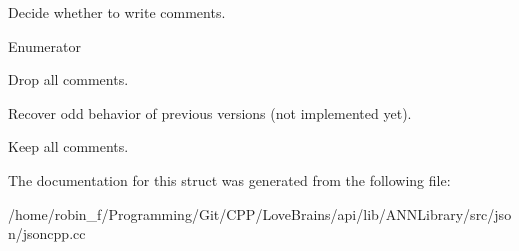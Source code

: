 Decide whether to write comments. 

\begin{Desc}
\item[Enumerator]\par
\begin{description}
\item[{\em 
\hypertarget{struct_json_1_1_comment_style_a51fc08f3518fd81eba12f340d19a3d0cac8b32a8bae63414c8647d4919da8d437}{}None\label{struct_json_1_1_comment_style_a51fc08f3518fd81eba12f340d19a3d0cac8b32a8bae63414c8647d4919da8d437}
}]Drop all comments. \item[{\em 
\hypertarget{struct_json_1_1_comment_style_a51fc08f3518fd81eba12f340d19a3d0cac65238f050773c107690a456e9c05c98}{}Most\label{struct_json_1_1_comment_style_a51fc08f3518fd81eba12f340d19a3d0cac65238f050773c107690a456e9c05c98}
}]Recover odd behavior of previous versions (not implemented yet). \item[{\em 
\hypertarget{struct_json_1_1_comment_style_a51fc08f3518fd81eba12f340d19a3d0ca32302c0b97190c1808b3e38f367fef01}{}All\label{struct_json_1_1_comment_style_a51fc08f3518fd81eba12f340d19a3d0ca32302c0b97190c1808b3e38f367fef01}
}]Keep all comments. \end{description}
\end{Desc}


The documentation for this struct was generated from the following file\+:\begin{DoxyCompactItemize}
\item 
/home/robin\+\_\+f/\+Programming/\+Git/\+C\+P\+P/\+Love\+Brains/api/lib/\+A\+N\+N\+Library/src/json/jsoncpp.\+cc\end{DoxyCompactItemize}
